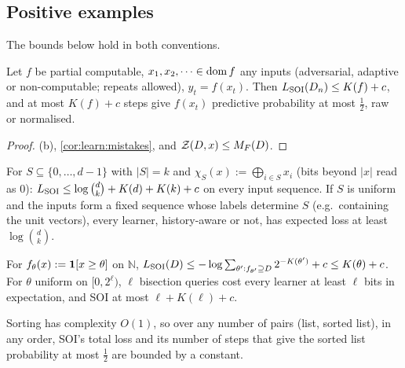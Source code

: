 \subsection{Positive examples}\label{sec:ex:positive}

The bounds below hold in both conventions.

\begin{proposition}\label{prop:ex:deterministic}
Let $f$ be partial computable, $x_1,x_2,\dots\in\operatorname{dom} f$ any inputs (adversarial, adaptive or non-computable; repeats allowed), $y_t=f(x_t)$. Then $L_{\mathrm{SOI}}(D_n)\le K(f)+c$, and at most $K(f)+c$ steps give $f(x_t)$ predictive probability at most $\frac12$, raw or normalised.
\end{proposition}

\begin{proof}
(b), \cref{cor:learn:mistakes}, and $\mathcal{Z}(D,x)\le M_{F}(D)$.
\end{proof}

\begin{example}\label{ex:ex:parity}
For $S\subseteq\{0,\dots,d-1\}$ with $|S|=k$ and $\chi_S(x):=\bigoplus_{i\in S}x_i$ (bits beyond $|x|$ read as $0$): $L_{\mathrm{SOI}}\le\log\binom dk+K(d)+K(k)+c$ on every input sequence. If $S$ is uniform and the inputs form a fixed sequence whose labels determine $S$ (e.g.\ containing the unit vectors), every learner, history-aware or not, has expected loss at least $\log\binom dk$.
\end{example}

\begin{example}[thresholds]\label{ex:ex:threshold}
For $f_\theta(x):=\mathbf{1}[x\ge\theta]$ on $\mathbb N$, $L_{\mathrm{SOI}}(D)\le-\log\sum_{\theta':f_{\theta'}\supseteq D}2^{-K(\theta')}+c\le K(\theta)+c$. For $\theta$ uniform on $[0,2^\ell)$, $\ell$ bisection queries cost every learner at least $\ell$ bits in expectation, and SOI at most $\ell+K(\ell)+c$.
\end{example}

\begin{example}[sorting]\label{ex:ex:sorting}
Sorting has complexity $O(1)$, so over any number of pairs (list, sorted list), in any order, SOI's total loss and its number of steps that give the sorted list probability at most $\frac12$ are bounded by a constant.
\end{example}

